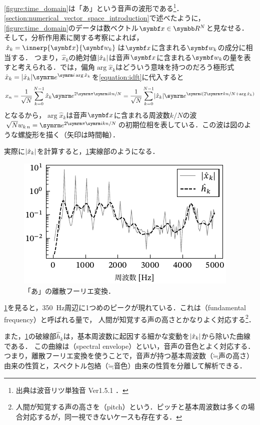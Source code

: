 \documentclass[../../main]{subfiles}
\begin{document}
\cref{figure:time_domain}は「あ」という音声の波形である\footnote{出典は波音リツ単独音 Ver1.5.1 \cite{canon}．}．
\cref{section:numerical_vector_space_introduction}で述べたように，\cref{figure:time_domain}のデータは数ベクトル\(\vect{x}\in\numset{R}^N\)と見なせる．
そして，分析作用素に関する考察によれば，\(\hat{x}_k=\innerp{\vect{x}}{\vect{w}_k}\)は\(\vect{x}\)に含まれる\(\vect{w}_k\)の成分に相当する．
つまり，\(\hat{x}_k\)の絶対値\(\lvert\hat{x}_k\rvert\)は音声\(\vect{x}\)に含まれる\(\vect{w}_k\)の量を表すと考えられる．では，偏角\(\arg\hat{x}_k\)はどういう意味を持つのだろう\？極形式\(\hat{x}_k=\abs{\hat{x}_k}\napr^{\iuni\arg\hat{x}_k}\)を\cref{equation:idft}に代入すると
\[
  x_n = \frac{1}{\sqrt{N}}\sum_{k=0}^{N-1}\hat{x}_k\napr^{2\krez\iuni kn/N}
  = \frac{1}{\sqrt{N}}\sum_{k=0}^{N-1}\abs{\hat{x}_k}\napr^{\iuni(2\krez kn/N+\arg\hat{x}_k)}
\]
となるから，\(\arg\hat{x}_k\)は音声\(\vect{x}\)に含まれる周波数\(k/N\)の波\(\sqrt{N}\midx{w}{k}{n}=\napr^{2\krez\iuni kn/N}\)の初期位相を表している．この波は図のような螺旋形を描く（矢印は時間軸）．

実際に\(\lvert\hat{x}_k\rvert\)を計算すると，\cref{figure:frequency_domain}実線部のようになる．

\begin{figure}[htbp]
  \centering
  \includegraphics{figures/frequency_domain.pdf}
  \caption{「あ」の離散フーリエ変換．}
  \label{figure:frequency_domain}
\end{figure}

\cref{figure:frequency_domain}を見ると，\SI{350}{Hz}周辺に1つめのピークが現れている．これは（fundamental frequency）と呼ばれる量で，
人間が知覚する声の高さとかなりよく対応する\footnote{人間が知覚する声の高さを（pitch）という．ピッチと基本周波数は多くの場合対応するが，同一視できないケースも存在する\cite{kashino}．}．

また，\cref{figure:frequency_domain}の破線部\(\hat{h}_k\)は，基本周波数に起因する細かな変動を\(\lvert\hat{x}_k\rvert\)から除いた曲線である．
この曲線は（spectral envelope）といい，音声の音色とよく対応する．
つまり，離散フーリエ変換を使うことで，音声が持つ基本周波数（\(\mathord{\fallingdotseq}\text{声の高さ}\)）由来の性質と，スペクトル包絡（\(\mathord{\fallingdotseq}\text{音色}\)）由来の性質を分離して解析できる．
\end{document}
